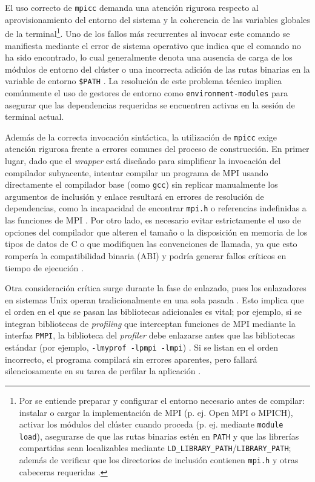 El uso correcto de \texttt{mpicc} demanda una atención rigurosa respecto al aprovisionamiento del entorno del sistema y la coherencia de las variables globales de la terminal\footnote{Por  se entiende preparar y configurar el entorno necesario antes de compilar: instalar o cargar la implementación de MPI (p. ej. Open MPI o MPICH), activar los módulos del clúster cuando proceda (p. ej. mediante \texttt{module load}), asegurarse de que las rutas binarias estén en \texttt{PATH} y que las librerías compartidas sean localizables mediante \texttt{LD\_LIBRARY\_PATH}/\texttt{LIBRARY\_PATH}; además de verificar que los directorios de inclusión contienen \texttt{mpi.h} y otras cabeceras requeridas \cite{pacheco_2011,open_mpi_2026}.}. Uno de los fallos más recurrentes al invocar este comando se manifiesta mediante el error de sistema operativo que indica que el comando no ha sido encontrado, lo cual generalmente denota una ausencia de carga de los módulos de entorno del clúster o una incorrecta adición de las rutas binarias en la variable de entorno \texttt{\$PATH} \cite{pacheco_2011}. La resolución de este problema técnico implica comúnmente el uso de gestores de entorno como \texttt{environment-modules} para asegurar que las dependencias requeridas se encuentren activas en la sesión de terminal actual.

Además de la correcta invocación sintáctica, la utilización de \texttt{mpicc} exige atención rigurosa frente a errores comunes del proceso de construcción. En primer lugar, dado que el \textit{wrapper} está diseñado para simplificar la invocación del compilador subyacente, intentar compilar un programa de MPI usando directamente el compilador base (como \texttt{gcc}) sin replicar manualmente los argumentos de inclusión y enlace resultará en errores de resolución de dependencias, como la incapacidad de encontrar \texttt{mpi.h} o referencias indefinidas a las funciones de MPI \cite{pacheco_2011, open_mpi_2026}. Por otro lado, es necesario evitar estrictamente el uso de opciones del compilador que alteren el tamaño o la disposición en memoria de los tipos de datos de C o que modifiquen las convenciones de llamada, ya que esto rompería la compatibilidad binaria (ABI) y podría generar fallos críticos en tiempo de ejecución \cite{mpi_forum_2025}.

Otra consideración crítica surge durante la fase de enlazado, pues los enlazadores en sistemas Unix operan tradicionalmente en una sola pasada \cite{gropp_using_mpi_1999}. Esto implica que el orden en el que se pasan las bibliotecas adicionales es vital; por ejemplo, si se integran bibliotecas de \textit{profiling} que interceptan funciones de MPI mediante la interfaz \texttt{PMPI}, la biblioteca del \textit{profiler} debe enlazarse antes que las bibliotecas estándar (por ejemplo, \texttt{-lmyprof -lpmpi -lmpi}) \cite{gropp_using_mpi_1999}. Si se listan en el orden incorrecto, el programa compilará sin errores aparentes, pero fallará silenciosamente en su tarea de perfilar la aplicación \cite{gropp_using_mpi_1999}.

